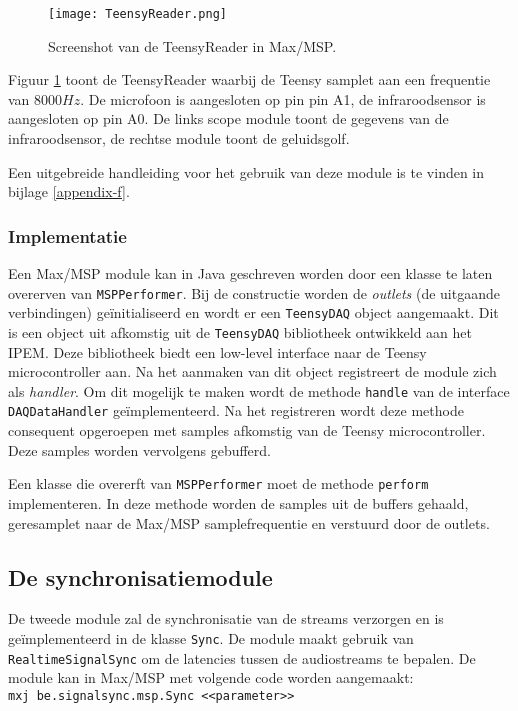 \begin{figure}[h!]
	\captionsetup{width=0.8\textwidth}
	\caption{Screenshot van de TeensyReader in Max/MSP.}
	\begin{center}
		\advance\parskip0.3cm
		\texttt{[image: TeensyReader.png]}
	\end{center}
	\label{teensyReader}
\end{figure}

Figuur \ref{teensyReader} toont de TeensyReader waarbij de Teensy samplet aan een frequentie van $8000Hz$. De microfoon is aangesloten op pin pin A1, de infraroodsensor is aangesloten op pin A0. De links scope module toont de gegevens van de infraroodsensor, de rechtse module toont de geluidsgolf. 

Een uitgebreide handleiding voor het gebruik van deze module is te vinden in bijlage \ref{appendix-f}.

\subsubsection{Implementatie}

Een Max/MSP module kan in Java geschreven worden door een klasse te laten overerven van \texttt{MSPPerformer}. Bij de constructie worden de \textit{outlets} (de uitgaande verbindingen) geïnitialiseerd en wordt er een \texttt{TeensyDAQ} object aangemaakt. Dit is een object uit afkomstig uit de \texttt{TeensyDAQ} bibliotheek ontwikkeld aan het IPEM. Deze bibliotheek biedt een low-level interface naar de Teensy microcontroller aan. Na het aanmaken van dit object registreert de module zich als \textit{handler}. Om dit mogelijk te maken wordt de methode \texttt{handle} van de interface \texttt{DAQDataHandler} geïmplementeerd. Na het registreren wordt deze methode consequent opgeroepen met samples afkomstig van de Teensy microcontroller. Deze samples worden vervolgens gebufferd.

Een klasse die overerft van \texttt{MSPPerformer} moet de methode \texttt{perform} implementeren. In deze methode worden de samples uit de buffers gehaald, geresamplet naar de Max/MSP samplefrequentie en verstuurd door de outlets.

\subsection{De synchronisatiemodule}
\label{sync-module}

De tweede module zal de synchronisatie van de streams verzorgen en is geïmplementeerd in de klasse \texttt{Sync}. De module maakt gebruik van \texttt{RealtimeSignalSync} om de latencies tussen de audiostreams te bepalen. De module kan in Max/MSP met volgende code worden aangemaakt: \texttt{mxj\textapprox\  be.signalsync.msp.Sync <<parameter>>}

